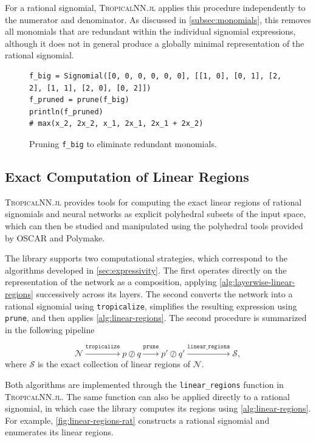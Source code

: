 \documentclass[10pt]{article}
\theoremstyle{definition}
\theoremstyle{remark}
\begin{document}
For a rational signomial, \textsc{TropicalNN.jl} applies this procedure independently to the numerator and denominator. As discussed in \cref{subsec:monomials}, this removes all monomials that are redundant within the individual signomial expressions, although it does not in general produce a globally minimal representation of the rational signomial.

\begin{figure}[H]
\begin{lstlisting}
f_big = Signomial([0, 0, 0, 0, 0, 0], [[1, 0], [0, 1], [2, 2], [1, 1], [2, 0], [0, 2]])
f_pruned = prune(f_big)
println(f_pruned)
# max(x_2, 2x_2, x_1, 2x_1, 2x_1 + 2x_2)
\end{lstlisting}
\caption{Pruning \texttt{f\_big} to eliminate redundant monomials.}
\label{fig:pruning}
\end{figure}

\subsection{Exact Computation of Linear Regions}

\textsc{TropicalNN.jl} provides tools for computing the exact 
linear regions of rational signomials and neural networks as explicit polyhedral subsets of the input space, which can then be studied and manipulated using the polyhedral tools provided by OSCAR and Polymake.

The library supports two computational strategies, which correspond to the algorithms developed in \cref{sec:expressivity}. The first operates directly on the representation of the network as a composition, applying \cref{alg:layerwise-linear-regions} successively across its
layers. The second converts the network into a rational signomial using \texttt{tropicalize}, simplifies the resulting expression using \texttt{prune}, and then applies \cref{alg:linear-regions}. The second procedure is summarized in the following pipeline


$$
\mathcal{N} \xrightarrow{\texttt{tropicalize}} p \oslash q \xrightarrow{\texttt{prune}} p'\oslash q' \xrightarrow{\texttt{linear\_regions}} \mathcal{S},
$$
where $\mathcal{S}$ is the exact collection of linear regions of
$\mathcal{N}$.

Both algorithms are implemented through the \texttt{linear\_regions} function in \textsc{TropicalNN.jl}. The same function can also be applied directly to a rational signomial, in which case the library computes its regions using \cref{alg:linear-regions}. For example, \cref{fig:linear-regions-rat} constructs a rational signomial and enumerates its linear regions.
\end{document}
